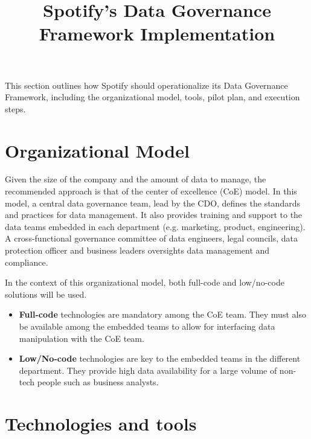 \documentclass[11pt,a4paper,computermodern]{article}
\title{Spotify's Data Governance Framework Implementation}
\date{}
\begin{document}
\maketitle

\vspace{-10mm}

This section outlines how Spotify should operationalize its Data Governance Framework, including the organizational model, tools, pilot plan, and execution steps.

\section*{Organizational Model}

Given the size of the company and the amount of data to manage, the recommended approach is that of the center of excellence (CoE) model. In this model, a central data governance team, lead by the CDO, defines the standards and practices for data management. It also provides training and support to the data teams embedded in each department (e.g. marketing, product, engineering). A cross-functional governance committee of data engineers, legal councils, data protection officer and business leaders oversights data management and compliance.

In the context of this organizational model, both full-code and low/no-code solutions will be used.
\begin{itemize}
	\item \textbf{Full-code} technologies are mandatory among the CoE team. They must also be available among the embedded teams to allow for interfacing data manipulation with the CoE team.
	\item \textbf{Low/No-code} technologies are key to the embedded teams in the different department. They provide high data availability for a large volume of non-tech people such as business analysts.
\end{itemize}


\section*{Technologies and tools}
\end{document}
